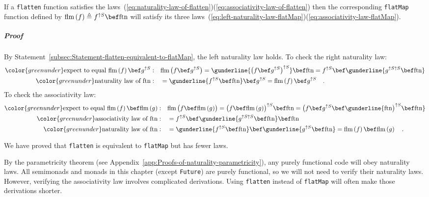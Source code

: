 If a \lstinline!flatten! function satisfies the laws~(\ref{eq:naturality-law-of-flatten})\textendash (\ref{eq:associativity-law-of-flatten})
then the corresponding \lstinline!flatMap! function defined by $\text{flm}\left(f\right)\triangleq f^{\uparrow S}\bef\text{ftn}$
will satisfy its three laws~(\ref{eq:left-naturality-law-flatMap})\textendash (\ref{eq:associativity-law-flatMap}).

\subparagraph{Proof}

By Statement~\ref{subsec:Statement-flatten-equivalent-to-flatMap},
the left naturality law holds. To check the right naturality law:
\begin{align*}
{\color{greenunder}\text{expect to equal }\text{flm}\left(f\right)\bef g^{\uparrow S}:}\quad & \text{flm}\,\big(f\bef g^{\uparrow S}\big)=\gunderline{\big(f\bef g^{\uparrow S}\big)^{\uparrow S}}\bef\text{ftn}=f^{\uparrow S}\bef\gunderline{g^{\uparrow S\uparrow S}\bef\text{ftn}}\\
{\color{greenunder}\text{naturality law of }\text{ftn}:}\quad & =\gunderline{f^{\uparrow S}\bef\text{ftn}}\bef g^{\uparrow S}=\text{flm}\left(f\right)\bef g^{\uparrow S}\quad.
\end{align*}
To check the associativity law:
\begin{align*}
{\color{greenunder}\text{expect to equal }\text{flm}\left(f\right)\bef\text{flm}\left(g\right):}\quad & \text{flm}\,\big(f\bef\text{flm}\,(g)\big)=\big(f\bef\text{flm}\,(g)\big)^{\uparrow S}\bef\text{ftn}=\big(f\bef g^{\uparrow S}\bef\gunderline{\text{ftn}\big)^{\uparrow S}\bef\text{ftn}}\\
{\color{greenunder}\text{associativity law of }\text{ftn}:}\quad & =f^{\uparrow S}\bef\gunderline{g^{\uparrow S\uparrow S}\bef\text{ftn}}\bef\text{ftn}\\
{\color{greenunder}\text{naturality law of }\text{ftn}:}\quad & =\gunderline{f^{\uparrow S}\bef\text{ftn}}\bef\gunderline{g^{\uparrow S}\bef\text{ftn}}=\text{flm}\left(f\right)\bef\text{flm}\left(g\right)\quad.
\end{align*}
 

We have proved that \lstinline!flatten! is equivalent to \lstinline!flatMap!
but has fewer laws.

By the parametricity theorem (see Appendix~\ref{app:Proofs-of-naturality-parametricity}),
any purely functional code will obey naturality laws. All semimonads
and monads in this chapter (except \lstinline!Future!) are purely
functional, so we will not need to verify their naturality laws. However,
verifying the associativity law involves complicated derivations.
Using \lstinline!flatten! instead of \lstinline!flatMap! will often
make those derivations shorter.

